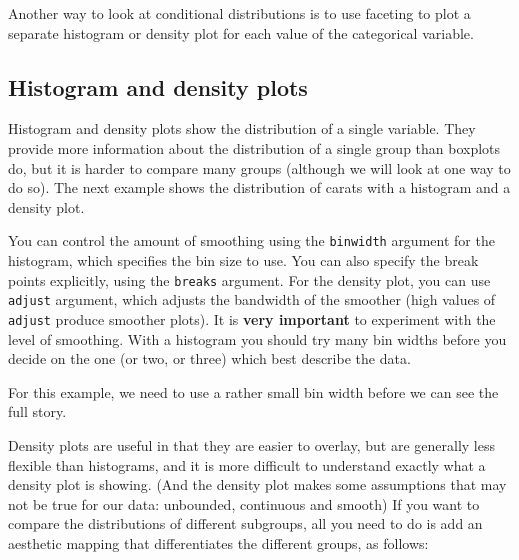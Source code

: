 Another way to look at conditional distributions is to use faceting to plot a separate histogram or density plot for each value of the categorical variable.

\subsection{Histogram and density plots}\label{sub:density}

Histogram and density plots show the distribution of a single variable.  They provide more information about the distribution of a single group than boxplots do, but it is harder to compare many groups (although we will look at one way to do so).  The next example shows the distribution of carats with a histogram and a density plot.

% 

You can control the amount of smoothing using the {\tt binwidth} argument for the histogram, which specifies the bin size to use.  You can also specify the break points explicitly, using the {\tt breaks} argument.  For the density plot, you can use {\tt adjust} argument, which adjusts the bandwidth of the smoother (high values of {\tt adjust} produce smoother plots).  It is {\bf very important} to experiment with the level of smoothing.  With a histogram you should try many bin widths before you decide on the one (or two, or three) which best describe the data.

For this example, we need to use a rather small bin width before we can see the full story.

% 

Density plots are useful in that they are easier to overlay, but are generally less flexible than histograms, and it is more difficult to understand exactly what a density plot is showing.  (And the density plot makes some assumptions that may not be true for our data: unbounded, continuous and smooth)  If you want to compare the distributions of different subgroups, all you need to do is add an aesthetic mapping that differentiates the different groups, as follows:

% 


